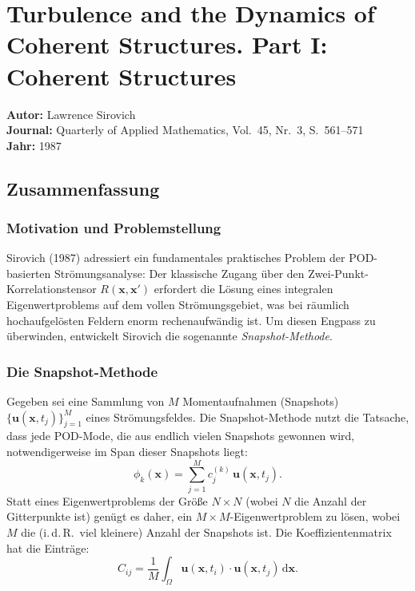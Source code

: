 \documentclass[a4paper,12pt]{article}
\begin{document}
\section*{Turbulence and the Dynamics of Coherent Structures. Part I: Coherent Structures}
\textbf{Autor:} Lawrence Sirovich \\
\textbf{Journal:} Quarterly of Applied Mathematics, Vol.\ 45, Nr.\ 3, S.\ 561--571 \\
\textbf{Jahr:} 1987

\subsection*{Zusammenfassung}

\subsubsection*{Motivation und Problemstellung}

Sirovich (1987) adressiert ein fundamentales praktisches Problem der POD-basierten Strömungsanalyse: Der klassische Zugang über den Zwei-Punkt-Korrelationstensor $R(\mathbf{x}, \mathbf{x}')$ erfordert die Lösung eines integralen Eigenwertproblems auf dem vollen Strömungsgebiet, was bei räumlich hochaufgelösten Feldern enorm rechenaufwändig ist. Um diesen Engpass zu überwinden, entwickelt Sirovich die sogenannte \emph{Snapshot-Methode}.

\subsubsection*{Die Snapshot-Methode}

Gegeben sei eine Sammlung von $M$ Momentaufnahmen (Snapshots) $\{\mathbf{u}(\mathbf{x}, t_j)\}_{j=1}^{M}$ eines Strömungsfeldes. Die Snapshot-Methode nutzt die Tatsache, dass jede POD-Mode, die aus endlich vielen Snapshots gewonnen wird, notwendigerweise im Span dieser Snapshots liegt:
\begin{equation}
\phi_k(\mathbf{x}) = \sum_{j=1}^{M} c_j^{(k)}\,\mathbf{u}(\mathbf{x}, t_j).
\end{equation}
Statt eines Eigenwertproblems der Größe $N \times N$ (wobei $N$ die Anzahl der Gitterpunkte ist) genügt es daher, ein $M \times M$-Eigenwertproblem zu lösen, wobei $M$ die (i.\,d.\,R.\ viel kleinere) Anzahl der Snapshots ist. Die Koeffizientenmatrix hat die Einträge:
\begin{equation}
C_{ij} = \frac{1}{M}\int_\Omega \mathbf{u}(\mathbf{x}, t_i) \cdot \mathbf{u}(\mathbf{x}, t_j)\,\mathrm{d}\mathbf{x}.
\end{equation}
\end{document}
